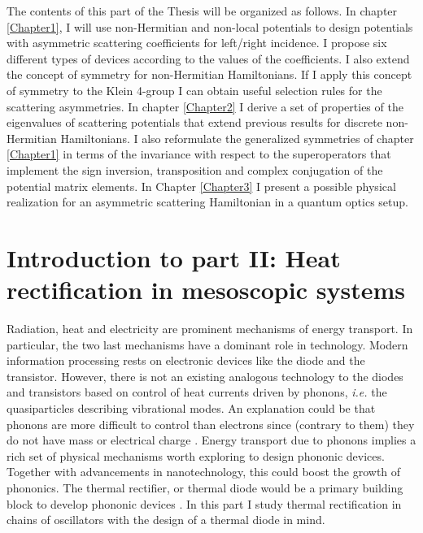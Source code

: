 The contents of this part of the Thesis will be organized as follows. In chapter \ref{Chapter1}, I will use non-Hermitian and non-local potentials to design potentials with asymmetric scattering coefficients for left/right incidence. I propose six different types of devices according to the values of the coefficients. I also extend the concept of symmetry for non-Hermitian Hamiltonians. If I apply this concept of symmetry to the Klein 4-group I can obtain useful selection rules for the scattering asymmetries. In chapter \ref{Chapter2} I derive a set of properties of the eigenvalues of scattering potentials that extend previous results for discrete non-Hermitian Hamiltonians. I also reformulate the generalized symmetries of chapter \ref{Chapter1} in terms of the invariance with respect to the superoperators that implement the sign inversion, transposition and complex conjugation of the potential matrix elements. In Chapter \ref{Chapter3} I present a possible physical realization for an asymmetric scattering Hamiltonian in a quantum optics setup.


\section*{Introduction to part II: Heat rectification in mesoscopic systems}

Radiation, heat and electricity are prominent mechanisms of energy transport. In particular, the two last mechanisms have a dominant role in technology. Modern information processing rests on electronic devices like the diode and the transistor. However, there is not an existing analogous technology to the diodes and transistors based on control of heat currents driven by phonons, \textit{i.e.} the quasiparticles describing vibrational modes. An explanation could be that phonons are more difficult to control than electrons since (contrary to them) they do not have mass or electrical charge \cite{Li2012}. Energy transport due to phonons implies a rich set of physical mechanisms worth exploring to design phononic devices. Together with advancements in nanotechnology, this could boost the growth of phononics. The thermal rectifier, or thermal diode would be a primary building block to develop phononic devices \cite{Li2012}. In this part I study thermal rectification in chains of oscillators with the design of a thermal diode in mind.

